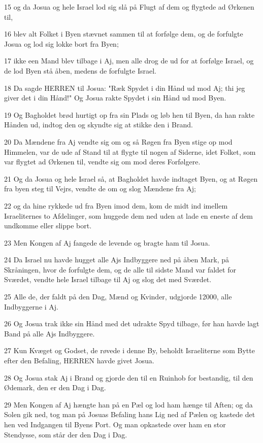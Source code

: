 \par 15 og da Josua og hele Israel lod sig slå på Flugt af dem og flygtede ad Ørkenen til,
\par 16 blev alt Folket i Byen stævnet sammen til at forfølge dem, og de forfulgte Josua og lod sig lokke bort fra Byen;
\par 17 ikke een Mand blev tilbage i Aj, men alle drog de ud for at forfølge Israel, og de lod Byen stå åben, medens de forfulgte Israel.
\par 18 Da sagde HERREN til Josua: "Ræk Spydet i din Hånd ud mod Aj; thi jeg giver det i din Hånd!" Og Josua rakte Spydet i sin Hånd ud mod Byen.
\par 19 Og Bagholdet brød hurtigt op fra sin Plads og løb hen til Byen, da han rakte Hånden ud, indtog den og skyndte sig at stikke den i Brand.
\par 20 Da Mændene fra Aj vendte sig om og så Røgen fra Byen stige op mod Himmelen, var de ude af Stand til at flygte til nogen af Siderne, idet Folket, som var flygtet ad Ørkenen til, vendte sig om mod deres Forfølgere.
\par 21 Og da Josua og hele Israel så, at Bagholdet havde indtaget Byen, og at Røgen fra byen steg til Vejrs, vendte de om og slog Mændene fra Aj;
\par 22 og da hine rykkede ud fra Byen imod dem, kom de midt ind imellem Israeliternes to Afdelinger, som huggede dem ned uden at lade en eneste af dem undkomme eller slippe bort.
\par 23 Men Kongen af Aj fangede de levende og bragte ham til Josua.
\par 24 Da Israel nu havde hugget alle Ajs Indbyggere ned på åben Mark, på Skråningen, hvor de forfulgte dem, og de alle til sidste Mand var faldet for Sværdet, vendte hele Israel tilbage til Aj og slog det med Sværdet.
\par 25 Alle de, der faldt på den Dag, Mænd og Kvinder, udgjorde 12000, alle Indbyggerne i Aj.
\par 26 Og Josua trak ikke sin Hånd med det udrakte Spyd tilbage, før han havde lagt Band på alle Ajs Indbyggere.
\par 27 Kun Kvæget og Godset, de røvede i denne By, beholdt Israeliterne som Bytte efter den Befaling, HERREN havde givet Josua.
\par 28 Og Josua stak Aj i Brand og gjorde den til en Ruinhob for bestandig, til den Ødemark, den er den Dag i Dag.
\par 29 Men Kongen af Aj hængte han på en Pæl og lod ham hænge til Aften; og da Solen gik ned, tog man på Josuas Befaling hans Lig ned af Pælen og kastede det hen ved Indgangen til Byens Port. Og man opkastede over ham en stor Stendysse, som står der den Dag i Dag.
